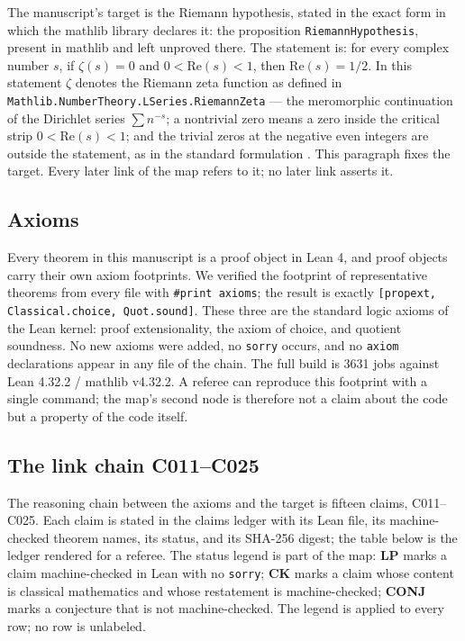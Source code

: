 \documentclass[sigplan,10pt,anonymous,review]{acmart}
\begin{document}
The manuscript's target is the Riemann hypothesis, stated in the exact
form in which the mathlib library declares it: the proposition
\texttt{RiemannHypothesis}, present in mathlib and left unproved there.
The statement is: for every complex number $s$, if $\zeta(s) = 0$ and
$0 < \mathrm{Re}(s) < 1$, then $\mathrm{Re}(s) = 1/2$. In this statement
$\zeta$ denotes the Riemann zeta function as defined in
\texttt{Mathlib.NumberTheory.LSeries.RiemannZeta} --- the meromorphic
continuation of the Dirichlet series $\sum n^{-s}$; a nontrivial zero
means a zero inside the critical strip $0 < \mathrm{Re}(s) < 1$; and the
trivial zeros at the negative even integers are outside the statement, as
in the standard formulation \cite{edwards1974riemann,hardy2008introduction}.
This paragraph fixes the target. Every later link of the map refers to
it; no later link asserts it.

\subsection{Axioms}

Every theorem in this manuscript is a proof object in Lean 4, and proof
objects carry their own axiom footprints. We verified the footprint of
representative theorems from every file with \verb|#print axioms|; the
result is exactly \texttt{[propext, Classical.choice, Quot.sound]}.
These three are the standard logic axioms of the Lean kernel: proof
extensionality, the axiom of choice, and quotient soundness. No new
axioms were added, no \texttt{sorry} occurs, and no \texttt{axiom}
declarations appear in any file of the chain. The full build is 3631
jobs against Lean 4.32.2 / mathlib v4.32.2. A referee can reproduce this
footprint with a single command; the map's second node is therefore not
a claim about the code but a property of the code itself.

\subsection{The link chain C011--C025}

The reasoning chain between the axioms and the target is fifteen claims,
C011--C025. Each claim is stated in the claims ledger with its Lean file,
its machine-checked theorem names, its status, and its SHA-256 digest;
the table below is the ledger rendered for a referee. The status legend
is part of the map: \textcolor{proved}{\textbf{LP}} marks a claim
machine-checked in Lean with no \texttt{sorry};
\textcolor{classical}{\textbf{CK}} marks a claim whose content is
classical mathematics and whose restatement is machine-checked;
\textcolor{conj}{\textbf{CONJ}} marks a conjecture that is not
machine-checked. The legend is applied to every row; no row is
unlabeled.
\end{document}
